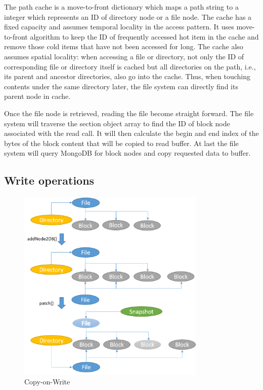     The path cache is a move-to-front dictionary \cite{mtf} which maps a path string to a integer which represents an ID of directory node or a file node. The cache has a fixed capacity and assumes temporal locality in the access pattern. It uses move-to-front algorithm to keep the ID of frequently accessed hot item in the cache and remove those cold items that have not been accessed for long. The cache also assumes spatial locality: when accessing a file or directory, not only the ID of corresponding file or directory itself is cached but all directories on the path, i.e., its parent and ancestor directories, also go into the cache. Thus, when touching contents under the same directory later, the file system can directly find its parent node in cache.

    Once the file node is retrieved, reading the file become straight forward. The file system will traverse the section object array to find the ID of block node associated with the read call. It will then calculate the begin and end index of the bytes of the block content that will be copied to read buffer. At last the file system will query MongoDB for block nodes and copy requested data to buffer.

\subsection{Write operations}

\begin{figure}[hbtp]
\centering
\includegraphics[width=0.8\textwidth]{Chapter-3/figs/fig10.png}
\caption{Copy-on-Write}
\label{fig:cow}
\end{figure}

